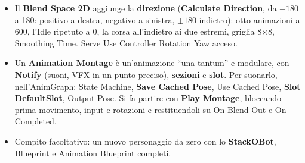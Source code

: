 \begin{itemize}
        va eseguito a ogni frame (Tick, timer, Timeline).
  \item Il \textbf{Blend Space 2D} aggiunge la \textbf{direzione} (\textbf{Calculate
        Direction}, da $-180$ a 180: positivo a destra, negativo a sinistra, $\pm 180$
        indietro): otto animazioni a 600, l'Idle ripetuto a 0, la corsa all'indietro ai
        due estremi, griglia 8$\times$8, Smoothing Time. Serve Use Controller Rotation Yaw
        acceso.
  \item Un \textbf{Animation Montage} è un'animazione ``una tantum'' e modulare, con
        \textbf{Notify} (suoni, VFX in un punto preciso), \textbf{sezioni} e
        \textbf{slot}. Per suonarlo, nell'AnimGraph: State Machine, \textbf{Save Cached
        Pose}, Use Cached Pose, \textbf{Slot DefaultSlot}, Output Pose. Si fa partire con
        \textbf{Play Montage}, bloccando prima movimento, input e rotazioni e
        restituendoli su On Blend Out e On Completed.
  \item Compito facoltativo: un nuovo personaggio da zero con lo \textbf{StackOBot},
        Blueprint e Animation Blueprint completi.
\end{itemize}
